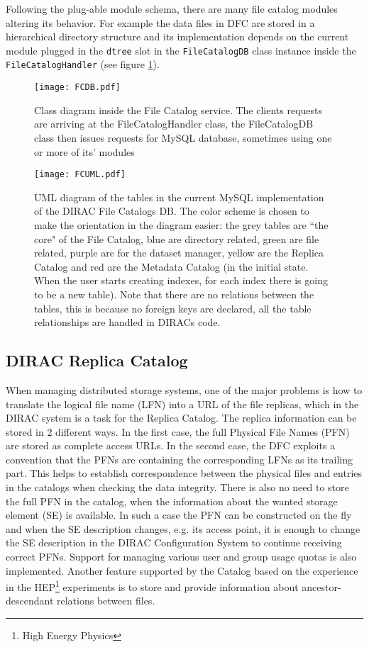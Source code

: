 Following the plug-able module schema, there are many file catalog modules altering its behavior. For example the 
data files in DFC are stored in a hierarchical directory structure and its implementation depends on the current
module plugged in the \texttt{dtree} slot in the \texttt{FileCatalogDB} class instance inside the 
\texttt{FileCatalogHandler} (see figure \ref{fig:FCClasses}). 

\begin{figure}[h]
	\centering
	\texttt{[image: FCDB.pdf]}
	\caption{Class diagram inside the File Catalog service. The clients requests are arriving at the 
	FileCatalogHandler class, the FileCatalogDB class then issues requests for MySQL database, sometimes using one
	or more of its' modules}
	\label{fig:FCClasses}
\end{figure}

\begin{figure}[b]
	\centering
	\texttt{[image: FCUML.pdf]}
	\caption{UML diagram of the tables in the current MySQL implementation of the DIRAC File Catalogs DB. The color 
	scheme is chosen to make the orientation in the diagram easier: the grey tables are ``the core" of the File Catalog, blue are
	directory related, green are file related, purple are for the dataset manager, yellow are the Replica Catalog
	and red are the Metadata Catalog (in the initial state. When the user starts creating indexes, for each 
	index there is going to be a new table). Note that there are no relations between the tables, this is because
	no foreign keys are declared, all the table relationships are handled in DIRACs code.}
	\label{fig:FCMySQLUML}
\end{figure}

\subsection{DIRAC Replica Catalog}

When managing distributed storage systems, one of the major problems is how to translate the logical 
file name (LFN) into a URL of the file replicas, which in the DIRAC system is a task for the Replica
Catalog. The replica information can be stored in 2 different ways. In the first case, the full Physical File
Names (PFN) are stored as complete access URLs. In the second case, the DFC exploits a convention
that the PFNs are containing the corresponding LFNs as its trailing part. 
This helps to establish correspondence between the physical files and entries in the catalogs when checking 
the data integrity. There is also no need to store the full PFN in the catalog, when
the information about the wanted storage element (SE) is available. In such a case the PFN can be constructed on 
the fly and when the SE description changes, e.g. its access point, it is enough to change the SE description in the DIRAC 
Configuration System to continue receiving correct PFNs. Support for managing various user and group usage 
quotas is also implemented. Another feature supported by the Catalog based on the experience in 
the HEP\footnote{High Energy Physics} experiments is to store and provide information about ancestor-descendant 
relations between files. 

